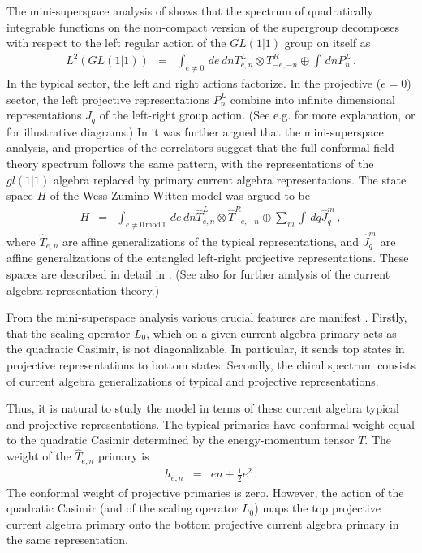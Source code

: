 \documentclass[12pt]{article}
\numberwithin{equation}{section}
\numberwithin{equation}{section}
\numberwithin{table}{section}\setlength{\multlinegap}{25pt}
\begin{document}
The mini-superspace analysis of \cite{Schomerus:2005bf} shows that the spectrum of quadratically integrable functions on the
non-compact version of the supergroup decomposes with respect to the left regular action of the $GL(1|1)$ group on itself as
\begin{eqnarray}
L^2 (GL(1|1)) &=& \int_{e \neq 0} \, de \, dn T_{e,n}^L \otimes T_{-e,-n}^R \oplus \int \, dn P_n^L \, .
\end{eqnarray}
In the typical sector, the left and right actions factorize. In the  projective ($e=0$) sector, the left projective representations $P_n^L$ combine into
infinite dimensional representations $J_q$ of the left-right group action. (See e.g. \cite{Schomerus:2005bf} for more explanation, or  \cite{Troost:2011fd,Mitev:2011zza}
for  illustrative diagrams.) In \cite{Schomerus:2005bf} it was further argued that the mini-superspace analysis, and properties
of the correlators suggest that the full conformal field theory spectrum follows the same pattern, with the representations
of the $gl(1|1)$ algebra replaced by primary current algebra representations. The state space $H$ of the Wess-Zumino-Witten model was argued to be
\begin{eqnarray}
H &=& \int_{e \neq 0 \,  \text{mod} \, 1} \, de \, dn \hat{T}_{e,n}^L \otimes \hat{T}^R_{-e,-n} \oplus \sum_m \int \, dq \hat{J}_q^m \, ,
\end{eqnarray}
where $\hat{T}_{e,n}$ are affine generalizations of the typical representations, and $\hat{J}_q^m$ are affine generalizations
of the entangled left-right projective representations. These spaces are described in detail in \cite{Schomerus:2005bf}. (See also
\cite{Creutzig:2011np} for further analysis of the current algebra representation theory.)

{From} the mini-superspace analysis various crucial features are manifest \cite{Schomerus:2005bf}. Firstly, that the scaling operator $L_0$, which on a given
current algebra primary acts as the quadratic Casimir, is not diagonalizable. In particular, it sends top states in projective representations to 
bottom states. Secondly, the chiral spectrum consists of current algebra generalizations of typical and projective representations.

Thus, it is natural to study the model in terms of these current algebra typical and projective representations.
 The typical primaries
 have conformal weight equal to the quadratic Casimir determined by the energy-momentum tensor $T$.
The weight of the $\hat{T}_{e,n}$ primary is
\begin{eqnarray}
h_{e,n} &=&  en + \frac{1}{2} e^2 \, .
\end{eqnarray}
The conformal weight of projective primaries is zero. However, the action of the quadratic Casimir (and of the scaling operator $L_0$) maps the top projective
current algebra primary onto the bottom projective current algebra primary in the same representation.
\end{document}
